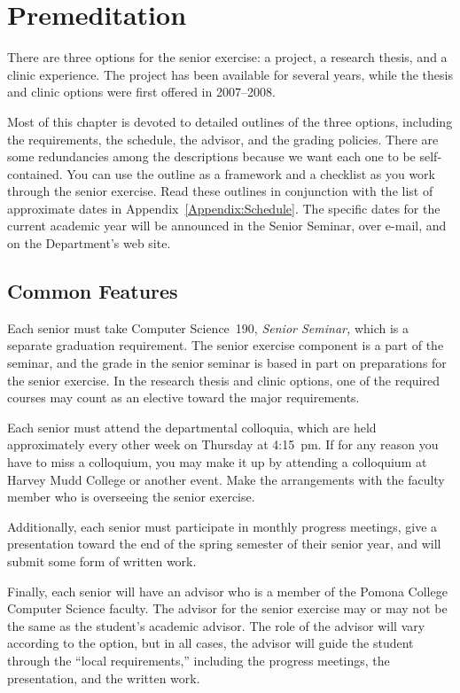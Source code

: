 \documentclass[finalcopy]{srpaper}
\def\hyperref[#1]{}
\let\plainref\ref
\newcommand{\plainref}{\ref*}
\newcommand{\namedref}[2]{\hyperref[#2]{#1~\plainref{#2}}}
\begin{document}
%
%
\chapter{Premeditation}
\label{Chapter:Premeditation}
There are three options for the senior exercise: a project,
a research thesis, and a clinic experience. The project has
been available for several years, while the thesis and
clinic options were first offered in 2007--2008.

Most of this chapter is devoted to detailed outlines of the
three options, including the requirements, the schedule, the
advisor, and the grading policies. There are some
redundancies among the descriptions because we want each one
to be self-contained. You can use the outline as a framework
and a checklist as you work through the senior
exercise. Read these outlines in conjunction with the list
of approximate dates in \namedref{Appendix}{Appendix:Schedule}.
The specific dates for the current academic year will be
announced in the Senior Seminar, over e-mail, and on the
Department's web site.

 
\section{Common Features}
Each senior must take Computer Science~190,
\textit{Senior Seminar,}
which is a separate graduation
requirement. The senior exercise component is a part
of the seminar, and the grade in the senior seminar
is based in part on preparations for the senior exercise.
In the research thesis and clinic options,
one of the required courses may count as an elective toward
the major requirements.

Each senior must attend the departmental
colloquia, which
are held approximately every other week on Thursday at
4:15~pm. If for any reason you have to miss a colloquium,
you may make it up by attending a colloquium at Harvey Mudd
College or another event. Make the arrangements with the
faculty member who is overseeing the senior exercise.

Additionally, each senior must participate in monthly
progress meetings,
give a presentation toward the end of the spring semester of
their senior year, and will submit some form of written
work.

Finally, each senior will have an advisor
who is a member of
the Pomona College Computer Science faculty. The advisor for
the senior exercise may or may not be the same as the
student's academic advisor. The role of the advisor will
vary according to the option, but in all cases, the advisor
will guide the student through the ``local requirements,''
including the progress meetings, the presentation, and the
written work.
\end{document}
